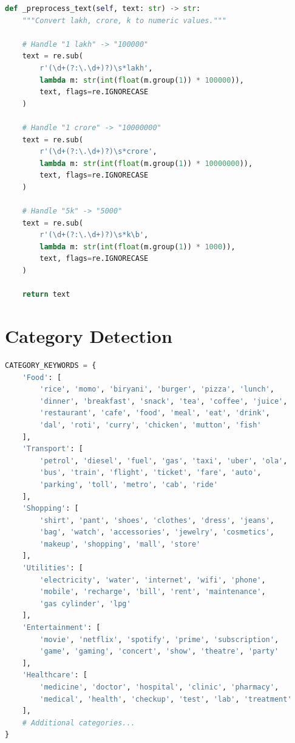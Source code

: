\begin{lstlisting}[language=Python, caption=Currency Format Preprocessing]
def _preprocess_text(self, text: str) -> str:
    """Convert lakh, crore, k to numeric values."""
    
    # Handle "1 lakh" -> "100000"
    text = re.sub(
        r'(\d+(?:\.\d+)?)\s*lakh',
        lambda m: str(int(float(m.group(1)) * 100000)),
        text, flags=re.IGNORECASE
    )
    
    # Handle "1 crore" -> "10000000"
    text = re.sub(
        r'(\d+(?:\.\d+)?)\s*crore',
        lambda m: str(int(float(m.group(1)) * 10000000)),
        text, flags=re.IGNORECASE
    )
    
    # Handle "5k" -> "5000"
    text = re.sub(
        r'(\d+(?:\.\d+)?)\s*k\b',
        lambda m: str(int(float(m.group(1)) * 1000)),
        text, flags=re.IGNORECASE
    )
    
    return text
\end{lstlisting}

\section{Category Detection}

\begin{lstlisting}[language=Python, caption=Category Keywords Dictionary]
CATEGORY_KEYWORDS = {
    'Food': [
        'rice', 'momo', 'biryani', 'burger', 'pizza', 'lunch', 
        'dinner', 'breakfast', 'snack', 'tea', 'coffee', 'juice',
        'restaurant', 'cafe', 'food', 'meal', 'eat', 'drink',
        'dal', 'roti', 'curry', 'chicken', 'mutton', 'fish'
    ],
    'Transport': [
        'petrol', 'diesel', 'fuel', 'gas', 'taxi', 'uber', 'ola',
        'bus', 'train', 'flight', 'ticket', 'fare', 'auto',
        'parking', 'toll', 'metro', 'cab', 'ride'
    ],
    'Shopping': [
        'shirt', 'pant', 'shoes', 'clothes', 'dress', 'jeans',
        'bag', 'watch', 'accessories', 'jewelry', 'cosmetics',
        'makeup', 'shopping', 'mall', 'store'
    ],
    'Utilities': [
        'electricity', 'water', 'internet', 'wifi', 'phone',
        'mobile', 'recharge', 'bill', 'rent', 'maintenance',
        'gas cylinder', 'lpg'
    ],
    'Entertainment': [
        'movie', 'netflix', 'spotify', 'prime', 'subscription',
        'game', 'gaming', 'concert', 'show', 'theatre', 'party'
    ],
    'Healthcare': [
        'medicine', 'doctor', 'hospital', 'clinic', 'pharmacy',
        'medical', 'health', 'checkup', 'test', 'lab', 'treatment'
    ],
    # Additional categories...
}
\end{lstlisting}

